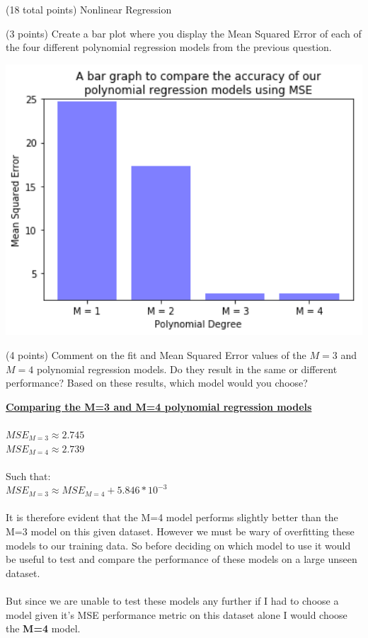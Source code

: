 \documentclass[12pt]{article}
\begin{document}
\begin{question}{(18 total points) Nonlinear Regression}
\begin{subquestion}{(3 points) Create a bar plot where you display the Mean Squared Error of each of the four different polynomial regression models from the previous question.}
\begin{answerbox}{35em}
\includegraphics [width=1\textwidth]{images/q2b-graph.png}
\end{answerbox}



\end{subquestion}


%
%
\begin{subquestion}{(4 points) Comment on the fit and Mean Squared Error values of the $M=3$ and $M=4$ polynomial regression models. 
Do they result in the same or different performance? 
Based on these results, which model would you choose?}


\begin{answerbox}{23em}
\large{\textbf{\underline{Comparing the M=3 and M=4 polynomial regression models}}}\\
\\
\normalsize{
$MSE_{M=3} \approx 2.745$\\
$MSE_{M=4} \approx 2.739$\\
\\
Such that:\\
$MSE_{M=3} \approx MSE_{M=4} + 5.846 * 10^{-3}$\\
\\
It is therefore evident that the M=4 model performs slightly better than the M=3 model on this given dataset. However we must be wary of overfitting these models to our training data. So before deciding on which model to use it would be useful to test and compare the performance of these models on a large unseen dataset.\\
\\
But since we are unable to test these models any further if I had to choose a model given it's MSE performance metric on this dataset alone I would choose the \textbf{M=4} model.
}
\end{answerbox}




\end{subquestion}
\end{question}
\end{document}
